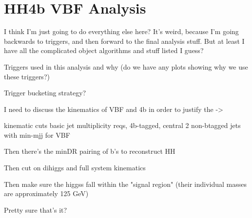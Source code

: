 \section{HH4b VBF Analysis}
    
    I think I'm just going to do everything else here? It's weird, because I'm going backwards to triggers,
        and then forward to the final analysis stuff. But at least I have all the complicated object algorithms and stuff listed I guess?


    Triggers used in this analysis and why (do we have any plots showing why we use these triggers?)

    Trigger bucketing strategy?

    I need to discuss the kinematics of VBF and 4b in order to justify the ->

    kinematic cuts
        basic jet multiplicity reqs,
        4b-tagged, central
        2 non-btagged jets with min-mjj for VBF

    Then there's the minDR pairing of b's to reconstruct HH

    Then cut on dihiggs and full system kinematics

    Then make sure the higgss fall within the "signal region" (their individual masses are approximately 125 GeV)

    Pretty sure that's it?



%
